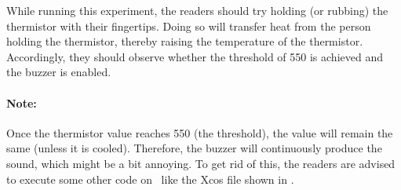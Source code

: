 \begin{enumerate}
        While running this experiment,
        the readers should try holding (or rubbing) the thermistor with their fingertips.
        Doing so will transfer heat from the person holding the
        thermistor, thereby raising the temperature of the thermistor.
        Accordingly, they should observe whether the threshold of 550 is achieved
        and the buzzer is enabled.

        \paragraph{Note:} Once the thermistor value reaches 550 (the threshold), the value will remain the same
        (unless it is cooled). Therefore, the buzzer will continuously produce the sound, which might be
        a bit annoying. To get rid of this, the readers are advised to
        execute some other code on \arduino\ like the Xcos file shown in
        .
\end{enumerate}


